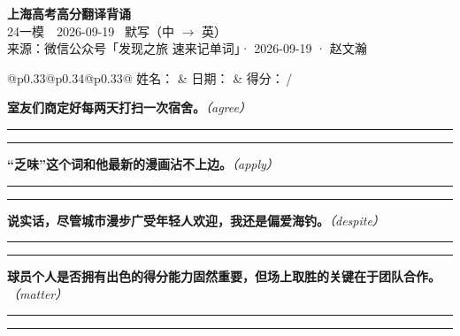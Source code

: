 \documentclass[11pt,a4paper]{article}
\newcommand{\num}[1]{\makebox[1.9em][r]{#1.}\hspace{0.3em}}
\newcommand{\wline}{\noindent\rule{\linewidth}{0.4pt}}
\newcommand{\prompt}[1]{\emph{\textcolor{tipblue}{\small（#1）}}}
\begin{document}
\pagestyle{plain}
\begin{center}
{\LARGE\bfseries 上海高考高分翻译背诵 }\\[0.25em]
{\large 24一模　2026-09-19 \quad\ 默写（中 $\to$ 英）}\\[0.35em]
{\footnotesize 来源：微信公众号「发现之旅 速来记单词」· 2026-09-19 · 赵文瀚}
\end{center}

\vspace{0.4em}
\noindent\begin{tabular}{@{}p{0.33\textwidth}@{}p{0.34\textwidth}@{}p{0.33\textwidth}@{}}
姓名：\underline{\hspace{2.0cm}} & 日期：\underline{\hspace{2.0cm}} & 得分：\underline{\hspace{1.4cm}}\,/ \\
\end{tabular}

\vspace{0.5em}

\vspace{0.8em}
\num{1}\textbf{室友们商定好每两天打扫一次宿舍。}\prompt{agree}

\vspace{0.3em}

\wline\vspace{0.3em}
\wline

\num{2}\textbf{“乏味”这个词和他最新的漫画沾不上边。}\prompt{apply}

\vspace{0.3em}

\wline\vspace{0.3em}
\wline

\num{3}\textbf{说实话，尽管城市漫步广受年轻人欢迎，我还是偏爱海钓。}\prompt{despite}

\vspace{0.3em}

\wline\vspace{0.3em}
\wline

\num{4}\textbf{球员个人是否拥有出色的得分能力固然重要，但场上取胜的关键在于团队合作。}\prompt{matter}

\vspace{0.3em}

\wline\vspace{0.3em}
\wline
\end{document}
